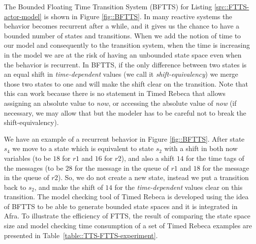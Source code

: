 The Bounded Floating Time Transition System (BFTTS) for Listing \ref{src::FTTS-actor-model} is shown in Figure \ref{fig::BFTTS}. 
In many reactive systems the behavior becomes recurrent after a while, and it gives us the chance to have a bounded number of states and transitions. When we add the notion of time to our model and consequently to the transition system, when the time is increasing in the model we are at the risk of having an unbounded %
state space even when the behavior is recurrent.
In BFTTS, if the only difference between two states is an equal shift in \textit{time-dependent} values (we call it \textit{shift-equivalency}) we merge those two states to one and will make the shift clear on the transition. %
Note that this can work because there is no statement in Timed Rebeca that allows assigning an absolute value to \textit{now}, or accessing the absolute value of \textit{now} (if necessary, we may allow that but the modeler has to be careful not to break the shift-equivalency). 

We have an example of a recurrent behavior in Figure \ref{fig::BFTTS}. After state $s_4$ we move to a state which is equivalent to state $s_2$ with a shift in both now variables (to be $18$ for $r1$  and $16$ for $r2$), and also a shift $14$ for the time tags of the messages (to be $28$ for the message in the queue of $r1$ and $18$ for the message in the queue of $r2$). So, we do not create a new state, instead we put a transition back to $s_2$, and make the shift of $14$ for the \textit{time-dependent} values clear on this transition. The model checking tool of Timed Rebeca is developed using the idea of BFTTS to be able to generate bounded state spaces and it is integrated in Afra. To illustrate the efficiency of FTTS, the result of comparing the state space size and model checking time consumption of a set of Timed Rebeca examples are presented in Table~\ref{table::TTS-FTTS-experiment}.


